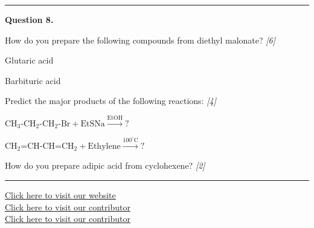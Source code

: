 \documentclass[11pt,a4paper]{article}
\newcommand{\pts}[1]{\hfill   \textit{[#1]}}
\begin{document}
\medskip\rule{\linewidth}{0.2pt}




\noindent   \textbf{Question 8.}

\begin{parts}
  \item How do you prepare the following compounds from diethyl malonate? \pts{6}
  
\begin{parts}
    \item Glutaric acid
    \item Barbituric acid
  \end{parts}
  \item Predict the major products of the following reactions: \pts{4}
  
\begin{parts}
    \item $ \text{CH}_3 \text{-CH}_2 \text{-CH}_2 \text{-Br} +  \text{EtSNa} \xrightarrow{ \text{EtOH}} ?$
    \item $ \text{CH}_2 \text{=CH-CH=CH}_2 +  \text{Ethylene} \xrightarrow{100^\circ \text{C}} ?$
  \end{parts}
  \item How do you prepare adipic acid from cyclohexene? \pts{2}
\end{parts}

\vfill
\rule{\linewidth}{0.4pt}

\begin{center}\small
  \href{https://bhu-exam.vercel.app/}{Click here to visit our website}\\[4pt]
  \href{https://me-aryan.vercel.app/}{Click here to visit our contributor}\\[4pt]
  \href{https://quashan-me.vercel.app/}{Click here to visit our contributor}
\end{center}
\end{document}

